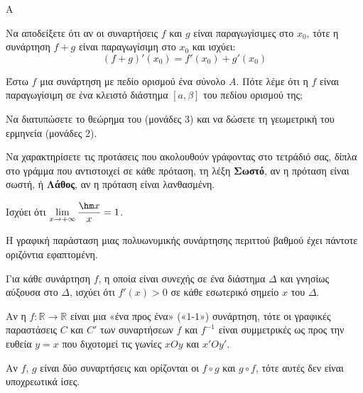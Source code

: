 \begin{thema}{Α}
\begin{erwthma}
    \item Να αποδείξετε ότι αν οι συναρτήσεις $f$ και $g$ είναι παραγωγίσιμες στο $x_0$, τότε η συνάρτηση $f + g$ είναι παραγωγίσιμη στο $x_0$ και ισχύει:
    \[
    (f + g)'(x_0) = f'(x_0) + g'(x_0)
    \]

    \item Έστω $f$ μια συνάρτηση με πεδίο ορισμού ένα σύνολο $A$. Πότε λέμε ότι η $f$ είναι παραγωγίσιμη σε ένα κλειστό διάστημα $[a, \beta]$ του πεδίου ορισμού της; 

    \item Να διατυπώσετε το θεώρημα του  (μονάδες 3) και να δώσετε τη γεωμετρική του ερμηνεία (μονάδες 2). 

    \item Να χαρακτηρίσετε τις προτάσεις που ακολουθούν γράφοντας στο τετράδιό σας, δίπλα στο γράμμα που αντιστοιχεί σε κάθε πρόταση, τη λέξη \textbf{Σωστό}, αν η πρόταση είναι σωστή, ή \textbf{Λάθος}, αν η πρόταση είναι λανθασμένη.
    \begin{alist}
        \item Ισχύει ότι $\displaystyle\lim_{x \to +\infty} \dfrac{\hm x}{x} = 1$.

        \item Η γραφική παράσταση μιας πολυωνυμικής συνάρτησης περιττού βαθμού έχει πάντοτε οριζόντια εφαπτομένη.

        \item Για κάθε συνάρτηση $f$, η οποία είναι συνεχής σε ένα διάστημα $\Delta$ και γνησίως αύξουσα στο $\Delta$, ισχύει ότι $f'(x) > 0$ σε κάθε εσωτερικό σημείο $x$ του $\Delta$.

        \item Αν η $f: \mathbb{R} \to \mathbb{R}$ είναι μια «ένα προς ένα» («$1$-$1$») συνάρτηση, τότε οι γραφικές παραστάσεις $C$ και $C'$ των συναρτήσεων $f$ και $f^{-1}$ είναι συμμετρικές ως προς την ευθεία $y = x$ που διχοτομεί τις γωνίες $x O y$ και $x' O y'$.

        \item Αν $f$, $g$ είναι δύο συναρτήσεις και ορίζονται οι $f \circ g$ και $g \circ f$, τότε αυτές δεν είναι υποχρεωτικά ίσες.
    \end{alist}
\end{erwthma}
\end{thema}

